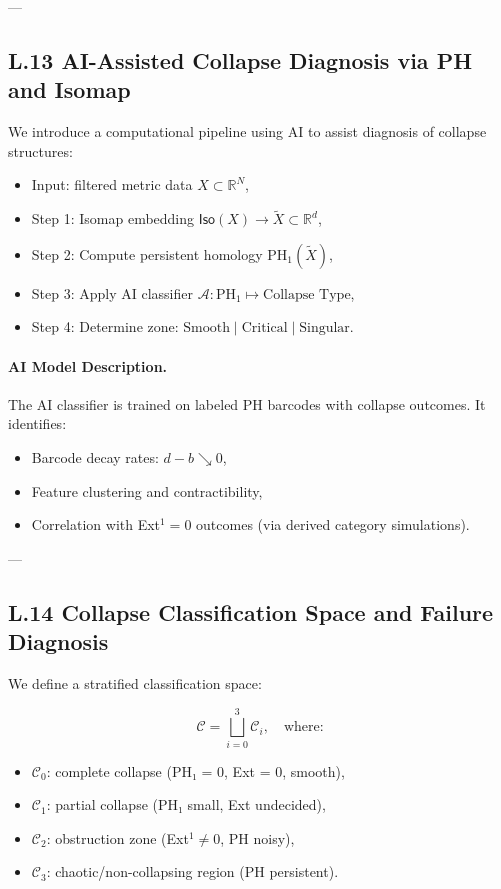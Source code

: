 \documentclass[11pt]{article}
\begin{document}
\begin{axiom}
\begin{axiom}
{{---

\subsection*{L.13 AI-Assisted Collapse Diagnosis via PH and Isomap}

We introduce a computational pipeline using AI to assist diagnosis of collapse structures:

\begin{itemize}
  \item Input: filtered metric data \( X \subset \mathbb{R}^N \),
  \item Step 1: Isomap embedding \( \mathsf{Iso}(X) \to \tilde{X} \subset \mathbb{R}^d \),
  \item Step 2: Compute persistent homology \( \mathrm{PH}_1(\tilde{X}) \),
  \item Step 3: Apply AI classifier \( \mathcal{A}: \mathrm{PH}_1 \mapsto \text{Collapse Type} \),
  \item Step 4: Determine zone: $\text{Smooth} \mid \text{Critical} \mid \text{Singular}$.
\end{itemize}

\paragraph{AI Model Description.}  
The AI classifier is trained on labeled PH barcodes with collapse outcomes.  
It identifies:
\begin{itemize}
  \item Barcode decay rates: $d-b \searrow 0$,
  \item Feature clustering and contractibility,
  \item Correlation with Ext$^1 = 0$ outcomes (via derived category simulations).
\end{itemize}

---

\subsection*{L.14 Collapse Classification Space and Failure Diagnosis}

We define a stratified classification space:

\[
\mathcal{C} = \bigsqcup_{i=0}^3 \mathcal{C}_i, \quad \text{where:}
\]

\begin{itemize}
  \item \( \mathcal{C}_0 \): complete collapse (PH₁ = 0, Ext = 0, smooth),
  \item \( \mathcal{C}_1 \): partial collapse (PH₁ small, Ext undecided),
  \item \( \mathcal{C}_2 \): obstruction zone (Ext$^1 \ne 0$, PH noisy),
  \item \( \mathcal{C}_3 \): chaotic/non-collapsing region (PH persistent).
\end{itemize}

}}
\end{axiom}
\end{axiom}
\end{document}
